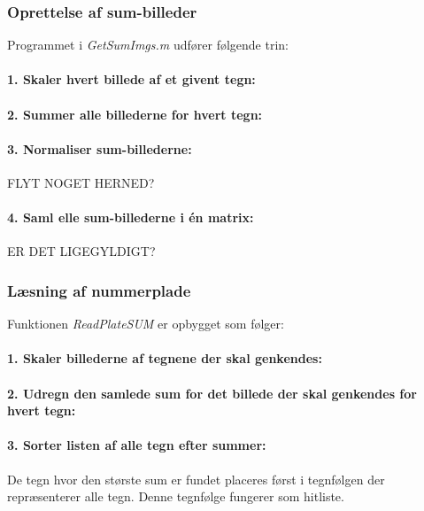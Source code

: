 \subsubsection*{Oprettelse af sum-billeder}
Programmet i \textit{GetSumImgs.m} udfører følgende trin:

\paragraph{1. Skaler hvert billede af et givent tegn:}

\paragraph{2. Summer alle billederne for hvert tegn:}

\paragraph{3. Normaliser sum-billederne:} FLYT NOGET HERNED?

\paragraph{4. Saml elle sum-billederne i én matrix:} ER DET LIGEGYLDIGT?

\subsubsection*{Læsning af nummerplade}

Funktionen \textit{ReadPlateSUM} er opbygget som følger:

\paragraph{1. Skaler billederne af tegnene der skal genkendes:}

\paragraph{2. Udregn den samlede sum for det billede der skal genkendes for hvert tegn:}

\paragraph{3. Sorter listen af alle tegn efter summer:} De tegn hvor den største sum er fundet placeres først i tegnfølgen der repræsenterer alle tegn. Denne tegnfølge fungerer som hitliste.

